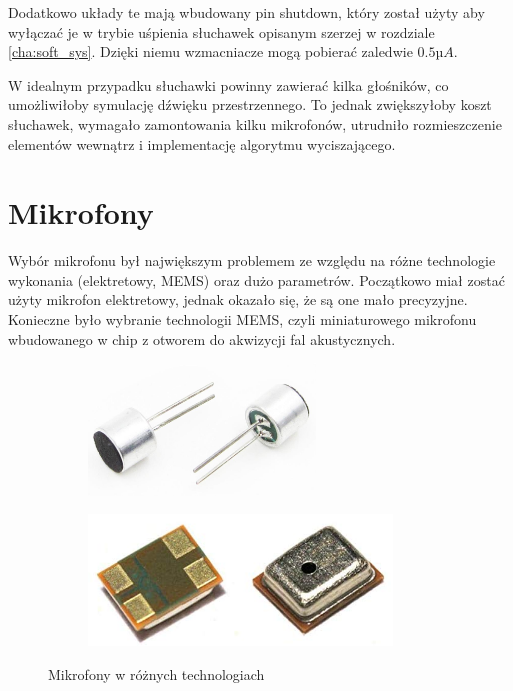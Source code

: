 Dodatkowo układy te mają wbudowany pin shutdown, który został użyty aby wyłączać je w trybie uśpienia słuchawek opisanym szerzej w rozdziale \ref{cha:soft_sys}. Dzięki niemu wzmacniacze mogą pobierać zaledwie $ 0.5 µA $.

W idealnym przypadku słuchawki powinny zawierać kilka głośników, co umożliwiłoby symulację dźwięku przestrzennego. To jednak zwiększyłoby koszt słuchawek, wymagało zamontowania kilku mikrofonów, utrudniło rozmieszczenie elementów wewnątrz i implementację algorytmu wyciszającego.


\section{Mikrofony}
\label{cha:mikrofony}

Wybór mikrofonu był największym problemem ze względu na różne technologie wykonania (elektretowy, MEMS) oraz dużo parametrów. Początkowo miał zostać użyty mikrofon elektretowy, jednak okazało się, że są one mało precyzyjne. Konieczne było wybranie technologii MEMS, czyli miniaturowego mikrofonu wbudowanego w chip z otworem do akwizycji fal akustycznych.

\begin{figure}[H]
	\centering
	\begin{subfigure}{.45\textwidth}
		\centering
		\includegraphics[height=3.5cm]{zdjecia/mic_electret.jpg}
	\end{subfigure}
	\begin{subfigure}{.45\textwidth}
		\centering
		\includegraphics[height=3.5cm]{zdjecia/mic_mems.jpg}
	\end{subfigure}
	\caption{\label{mikrofony} Mikrofony w różnych technologiach}
\end{figure}

